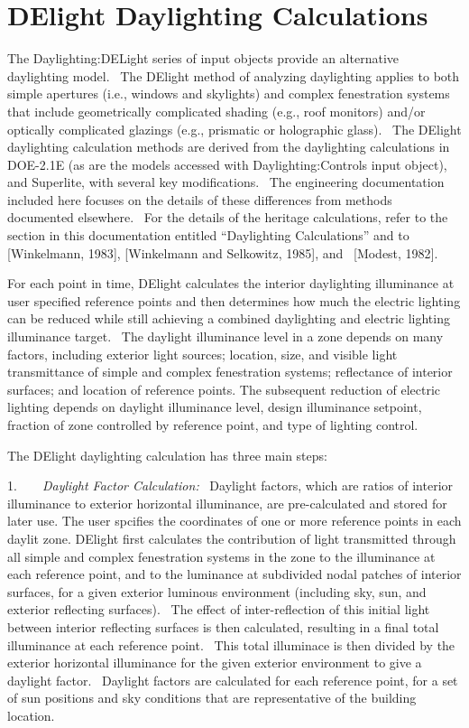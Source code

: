 \section{DElight Daylighting Calculations}\label{delight-daylighting-calculations}

The Daylighting:DELight series of input objects provide an alternative daylighting model.~ The DElight method of analyzing daylighting applies to both simple apertures (i.e., windows and skylights) and complex fenestration systems that include geometrically complicated shading (e.g., roof monitors) and/or optically complicated glazings (e.g., prismatic or holographic glass).~ The DElight daylighting calculation methods are derived from the daylighting calculations in DOE-2.1E (as are the models accessed with Daylighting:Controls input object), and Superlite, with several key modifications.~ The engineering documentation included here focuses on the details of these differences from methods documented elsewhere.~ For the details of the heritage calculations, refer to the section in this documentation entitled ``Daylighting Calculations'' and to {[}Winkelmann, 1983{]}, {[}Winkelmann and Selkowitz, 1985{]}, and~ {[}Modest, 1982{]}.

For each point in time, DElight calculates the interior daylighting illuminance at user specified reference points and then determines how much the electric lighting can be reduced while still achieving a combined daylighting and electric lighting illuminance target.~ The daylight illuminance level in a zone depends on many factors, including exterior light sources; location, size, and visible light transmittance of simple and complex fenestration systems; reflectance of interior surfaces; and location of reference points. The subsequent reduction of electric lighting depends on daylight illuminance level, design illuminance setpoint, fraction of zone controlled by reference point, and type of lighting control.

The DElight daylighting calculation has three main steps:

1.~~~~\emph{Daylight Factor Calculation:}~ Daylight factors, which are ratios of interior illuminance to exterior horizontal illuminance, are pre-calculated and stored for later use. The user spcifies the coordinates of one or more reference points in each daylit zone. DElight first calculates the contribution of light transmitted through all simple and complex fenestration systems in the zone to the illuminance at each reference point, and to the luminance at subdivided nodal patches of interior surfaces, for a given exterior luminous environment (including sky, sun, and exterior reflecting surfaces).~ The effect of inter-reflection of this initial light between interior reflecting surfaces is then calculated, resulting in a final total illuminance at each reference point.~ This total illuminace is then divided by the exterior horizontal illuminance for the given exterior environment to give a daylight factor.~ Daylight factors are calculated for each reference point, for a set of sun positions and sky conditions that are representative of the building location.

